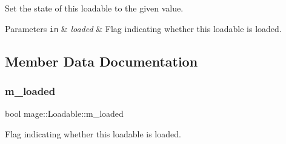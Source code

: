 Set the state of this loadable to the given value.


\begin{DoxyParams}[1]{Parameters}
\mbox{\tt in}  & {\em loaded} & Flag indicating whether this loadable is loaded. \\
\hline
\end{DoxyParams}


\subsection{Member Data Documentation}
\hypertarget{classmage_1_1_loadable_a993963fbfeb0f2e2ab9616bf7ef6a0f7}{}\label{classmage_1_1_loadable_a993963fbfeb0f2e2ab9616bf7ef6a0f7} 
\subsubsection{\texorpdfstring{m\+\_\+loaded}{m\_loaded}}
{\footnotesize\ttfamily bool mage\+::\+Loadable\+::m\+\_\+loaded\hspace{0.3cm}{\ttfamily [private]}}

Flag indicating whether this loadable is loaded. 